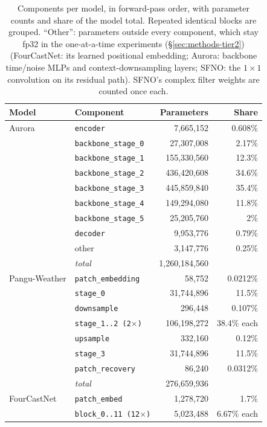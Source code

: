 \begin{table}[htbp]
\centering
\small
\caption{Components per model, in forward-pass order, with parameter counts and share of the model total. Repeated identical blocks are grouped. ``Other'': parameters outside every component, which stay fp32 in the one-at-a-time experiments (\S\ref{sec:methods-tier2}) (FourCastNet: its learned positional embedding; Aurora: backbone time/noise MLPs and context-downsampling layers; SFNO: the $1\times1$ convolution on its residual path). SFNO's complex filter weights are counted once each.}
\label{tab:components}
\begin{tabular}{llrr}
\toprule
Model & Component & Parameters & Share \\
\midrule
Aurora & \texttt{encoder} & 7{,}665{,}152 & 0.608\% \\
 & \texttt{backbone\_stage\_0} & 27{,}307{,}008 & 2.17\% \\
 & \texttt{backbone\_stage\_1} & 155{,}330{,}560 & 12.3\% \\
 & \texttt{backbone\_stage\_2} & 436{,}420{,}608 & 34.6\% \\
 & \texttt{backbone\_stage\_3} & 445{,}859{,}840 & 35.4\% \\
 & \texttt{backbone\_stage\_4} & 149{,}294{,}080 & 11.8\% \\
 & \texttt{backbone\_stage\_5} & 25{,}205{,}760 & 2\% \\
 & \texttt{decoder} & 9{,}953{,}776 & 0.79\% \\
 & other & 3{,}147{,}776 & 0.25\% \\
 & \textit{total} & 1{,}260{,}184{,}560 & \\
\addlinespace
Pangu-Weather & \texttt{patch\_embedding} & 58{,}752 & 0.0212\% \\
 & \texttt{stage\_0} & 31{,}744{,}896 & 11.5\% \\
 & \texttt{downsample} & 296{,}448 & 0.107\% \\
 & \texttt{stage\_1..2 (2$\times$)} & 106{,}198{,}272 & 38.4\% each \\
 & \texttt{upsample} & 332{,}160 & 0.12\% \\
 & \texttt{stage\_3} & 31{,}744{,}896 & 11.5\% \\
 & \texttt{patch\_recovery} & 86{,}240 & 0.0312\% \\
 & \textit{total} & 276{,}659{,}936 & \\
\addlinespace
FourCastNet & \texttt{patch\_embed} & 1{,}278{,}720 & 1.7\% \\
 & \texttt{block\_0..11 (12$\times$)} & 5{,}023{,}488 & 6.67\% each \\

\end{tabular}
\end{table}
